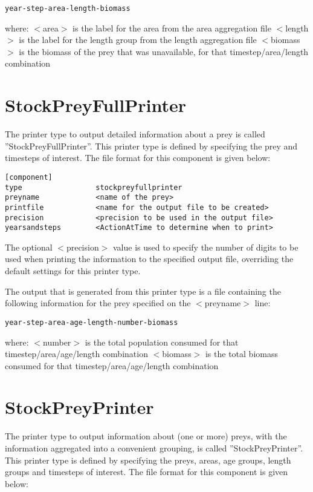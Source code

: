 \documentclass[10pt,twoside]{book}
\begin{document}
{\small\begin{verbatim}
year-step-area-length-biomass
\end{verbatim}}

where:\newline
$<$area$>$ is the label for the area from the area aggregation file\newline
$<$length$>$ is the label for the length group from the length aggregation file\newline
$<$biomass$>$ is the biomass of the prey that was unavailable, for that timestep/area/length combination

\section{StockPreyFullPrinter}\label{sec:stockpreyfullprinter}
The printer type to output detailed information about a prey is called ''StockPreyFullPrinter''.  This printer type is defined by specifying the prey and timesteps of interest.  The file format for this component is given below:

{\small\begin{verbatim}
[component]
type                 stockpreyfullprinter
preyname             <name of the prey>
printfile            <name for the output file to be created>
precision            <precision to be used in the output file>
yearsandsteps        <ActionAtTime to determine when to print>
\end{verbatim}}

The optional $<$precision$>$ value is used to specify the number of digits to be used when printing the information to the specified output file, overriding the default settings for this printer type.

\bigskip
The output that is generated from this printer type is a file containing the following information for the prey specified on the $<$preyname$>$ line:

{\small\begin{verbatim}
year-step-area-age-length-number-biomass
\end{verbatim}}

where:\newline
$<$number$>$ is the total population consumed for that timestep/area/age/length combination\newline
$<$biomass$>$ is the total biomass consumed for that timestep/area/age/length combination

\section{StockPreyPrinter}\label{sec:stockpreyprinter}
The printer type to output information about (one or more) preys, with the information aggregated into a convenient grouping, is called ''StockPreyPrinter''.  This printer type is defined by specifying the preys, areas, age groups, length groups and timesteps of interest.  The file format for this component is given below:
\end{document}
